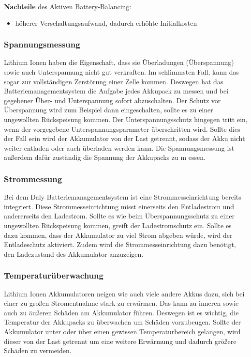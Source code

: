\textbf{Nachteile} des Aktiven Battery-Balancing:
\begin{itemize}
\item {höherer Verschaltungsaufwand, dadurch erhöhte Initialkosten}
\end{itemize}
\newpage

\subsubsection{Spannungsmessung}

Lithium Ionen haben die Eigenschaft, dass sie Überladungen (Überspannung) sowie auch Unterspannung nicht gut verkraften. Im schlimmsten Fall, kann das sogar zur vollständigen Zerstörung einer Zelle kommen. Deswegen hat das Batteriemanagementsystem die Aufgabe jedes Akkupack zu messen und bei gegebener Über- und Unterspannung sofort abzuschalten. Der Schutz vor Überspannung wird zum Beispiel dann eingeschalten, sollte es zu einer ungewollten Rückspeisung kommen. Der Unterspannungsschutz hingegen tritt ein, wenn der vorgegebene Unterspannungsparameter überschritten wird. Sollte dies der Fall sein wird der Akkumulator von der Last getrennt, sodass der Akku nicht weiter entladen oder auch überladen werden kann. Die Spannungsmessung ist außerdem dafür zuständig die Spannung der Akkupacks zu m
essen.
\subsubsection{Strommessung}

Bei dem Daly Batteriemanagementsystem ist eine Strommesseinrichtung bereits integriert. Diese Strommesseinrichtung misst einerseits den Entladestrom und andererseits den Ladestrom. Sollte es wie beim Überspannungsschutz zu einer ungewollten Rückspeisung kommen, greift der Ladestromschutz ein. Sollte es dazu kommen, dass der Akkumulator zu viel Strom abgeben würde, wird der Entladeschutz aktiviert. Zudem wird die Strommesseinrichtung dazu benötigt, den Ladezustand des Akkumulator anzuzeigen.

\subsubsection{Temperaturüberwachung}

Lithium Ionen Akkumulatoren neigen wie auch viele andere Akkus dazu, sich bei einer zu großen Stromentnahme stark zu erwärmen. Das kann zu inneren sowie auch zu äußeren Schäden am Akkumulator führen. Deswegen ist es wichtig, die Temperatur der Akkupacks zu überwachen um Schäden vorzubeugen. Sollte der Akkumulator unter oder über einen gewissen Temperaturbereich gelangen, wird dieser von der Last getrennt um eine weitere Erwärmung und dadurch größere Schäden zu vermeiden.
\newpage

